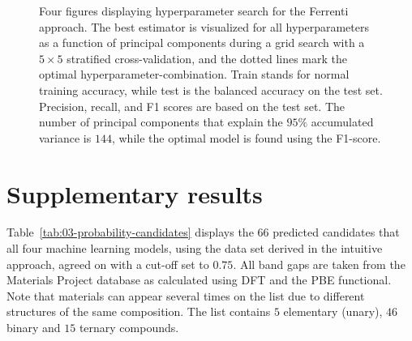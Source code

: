 \documentclass[superscriptaddress,unsortedaddress,
 amsmath,amssymb,
 aps,
]{revtex4-2}
\begin{document}
\begin{figure}[ht!]
\begin{subfigure}[b]{1.0\textwidth}
    \centering
    
  \end{subfigure}
  \par\bigskip
  \begin{subfigure}[b]{0.5\textwidth}
    
    \caption{}
    \label{fig:q1-LOG}
  \end{subfigure}%
    \hfill
  \begin{subfigure}[b]{0.5\textwidth}
    
    \caption{}
    \label{fig:q1-DT}
  \end{subfigure}
  
  \begin{subfigure}[b]{0.5\textwidth}
    
    \caption{}
    \label{fig:q1-RF}
  \end{subfigure}%
   \hfill
  \begin{subfigure}[b]{0.5\textwidth}
    
    \caption{}
    \label{fig:q1-GB}
  \end{subfigure}
  \caption{{Four figures displaying hyperparameter search for the Ferrenti approach. The best estimator is visualized for all hyperparameters as a function of principal components during a grid search with a $5\times5$ stratified cross-validation, and the dotted lines mark the optimal hyperparameter-combination. Train stands for normal training accuracy, while test is the balanced accuracy on the test set. Precision, recall, and F1 scores are based on the test set. The number of principal components that explain the $95\%$ accumulated variance is $144$, while the optimal model is found using the F1-score.}}
  \label{fig:01-pca}
\end{figure}

\clearpage

\section*{Supplementary results}
Table~\ref{tab:03-probability-candidates} displays the 66 predicted candidates that all four machine learning models, using the data set derived in the intuitive approach, agreed on with a cut-off set to $0.75$. All band gaps are taken from the Materials Project database as calculated using DFT and the PBE functional. Note that materials can appear several times  on  the  list due  to  different  structures of the same composition. The  list  contains $5$ elementary (unary), $46$  binary and  $15$ ternary compounds. 
\end{document}

